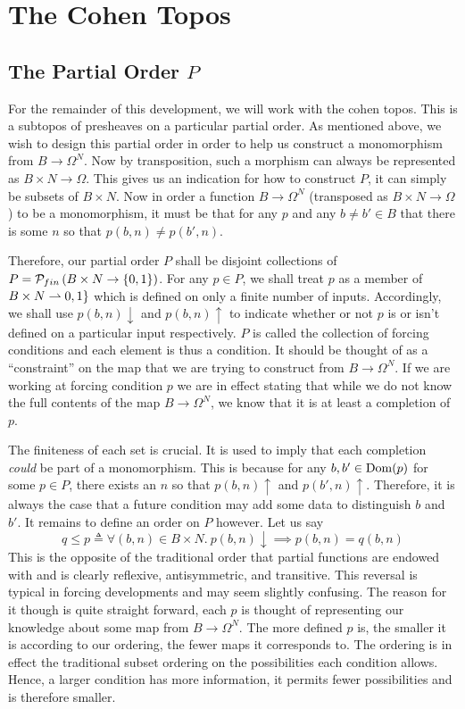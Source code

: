\section{The Cohen Topos}\label{sec:cohentopos}
\subsection{The Partial Order \texorpdfstring{$P$}{P}}\label{subsec:partialorder}\hfill

For the remainder of this development, we will work with the cohen
topos. This is a subtopos of presheaves on a particular partial
order. As mentioned above, we wish to design this partial order in
order to help us construct a monomorphism from $B \to \Omega^N$. Now
by transposition, such a morphism can always be represented as
$B \times N \to \Omega$. This gives us an indication for how to
construct $P$, it can simply be subsets of $B \times N$. Now in order
a function $B \to \Omega^N$ (transposed as $B \times N \to \Omega$) to
be a monomorphism, it must be that for any $p$ and any
$b \neq b' \in B$ that there is some $n$ so that
$p(b, n) \neq p(b', n)$.

Therefore, our partial order $P$ shall be disjoint collections of
$P = \powfin{B \times N \to \{0, 1\}}$. For any $p \in P$, we shall
treat $p$ as a member of $B \times N \pto \{0, 1\}$ which is defined
on only a finite number of inputs. Accordingly, we shall use
$p(b, n) \downarrow$ and $p(b, n)\uparrow$ to indicate whether or not
$p$ is or isn't defined on a particular input respectively. $P$ is
called the collection of forcing conditions and each element is thus a
condition. It should be thought of as a ``constraint'' on the map that
we are trying to construct from $B \to \Omega^N$. If we are working at
forcing condition $p$ we are in effect stating that while we do not
know the full contents of the map $B \to \Omega^N$, we know that it is
at least a completion of $p$.

The finiteness of each set is crucial. It is used to imply that each
completion \emph{could} be part of a monomorphism. This is because for
any $b, b' \in \dom(p)$ for some $p \in P$, there exists an $n$ so
that $p(b, n) \uparrow$ and $p(b', n) \uparrow$. Therefore, it is
always the case that a future condition may add some data to
distinguish $b$ and $b'$. It remains to define an order on $P$
however. Let us say
\[
  q \le p \triangleq \forall (b, n) \in B \times N.
  \ p(b, n) \downarrow \implies p(b, n) = q(b, n)
\]
This is the opposite of the traditional order that partial functions
are endowed with and is clearly reflexive, antisymmetric, and
transitive. This reversal is typical in forcing developments and may
seem slightly confusing. The reason for it though is quite straight
forward, each $p$ is thought of representing our knowledge about some
map from $B \to \Omega^N$. The more defined $p$ is, the smaller it is
according to our ordering, the fewer maps it corresponds to. The
ordering is in effect the traditional subset ordering on the
possibilities each condition allows. Hence, a larger condition has
more information, it permits fewer possibilities and is therefore
smaller.

